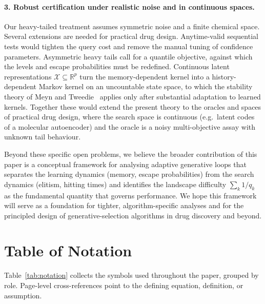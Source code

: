 \documentclass[11pt,a4paper]{article}
\newcommand{\X}{\mathcal{X}}
\newcommand{\R}{\mathbb{R}}
\begin{document}
\paragraph{3. Robust certification under realistic noise and in continuous
spaces.}
Our heavy-tailed treatment assumes symmetric noise and a finite chemical
space.  Several extensions are needed for practical drug design.
Anytime-valid sequential tests would tighten the query cost and remove the
manual tuning of confidence parameters.  Asymmetric heavy tails call for a
quantile objective, against which the levels and escape probabilities must
be redefined.  Continuous latent representations $\X\subseteq\R^p$ turn the
memory-dependent kernel into a history-dependent Markov kernel on an
uncountable state space, to which the stability theory of Meyn and
Tweedie~\cite{MeynTweedie1993} applies only after substantial adaptation to
learned kernels.  Together these would extend the present theory to the
oracles and spaces of practical drug design, where the search space is
continuous (e.g.\ latent codes of a molecular autoencoder) and the oracle
is a noisy multi-objective assay with unknown tail behaviour.

Beyond these specific open problems, we believe the broader contribution of
this paper is a conceptual framework for analysing adaptive generative
loops that separates the learning dynamics (memory, escape probabilities)
from the search dynamics (elitism, hitting times) and identifies the
landscape difficulty $\sum_k 1/q_k$ as the fundamental quantity that
governs performance.  We hope this framework will serve as a foundation for
tighter, algorithm-specific analyses and for the principled design of
generative-selection algorithms in drug discovery and beyond.

\appendix

\section{Table of Notation}
\label{app:notation}

Table~\ref{tab:notation} collects the symbols used throughout the paper,
grouped by role.  Page-level cross-references point to the defining
equation, definition, or assumption.
\end{document}
